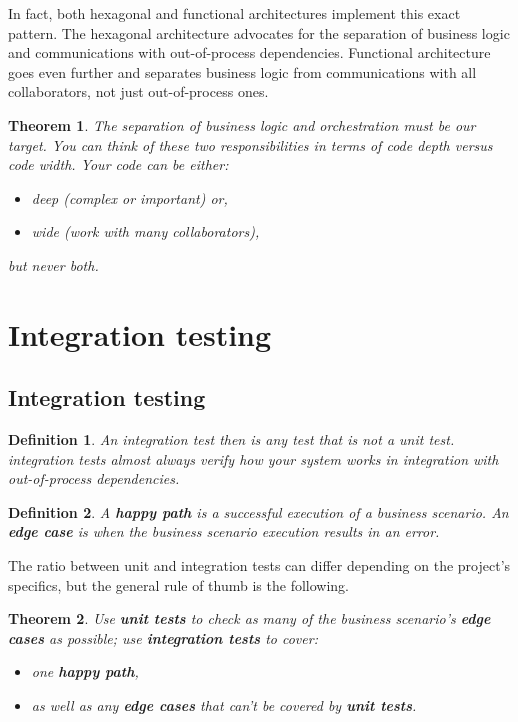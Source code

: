\documentclass{article}
\newtheorem{definition}{Definition}
\newtheorem{theorem}{Theorem}
\begin{document}
In fact, both hexagonal and functional architectures implement this exact pattern. The hexagonal architecture advocates for the separation of business logic and communications with out-of-process dependencies. Functional architecture goes even further and separates business logic from communications with all collaborators, not just out-of-process ones. 

\begin{theorem}
The separation of business logic and orchestration must be our target. You can think of these two responsibilities in terms of code depth versus code width. Your code can be either:
\begin{itemize}
	\item deep (complex or important) or,
	\item wide (work with many collaborators),
\end{itemize}
but never both.
\end{theorem}

\section{Integration testing}

\subsection{Integration testing}

\begin{definition}
An integration test then is any test that is not a unit test. integration tests almost always verify how your system works in integration with out-of-process dependencies.
\end{definition}


\begin{definition}
A \textbf{happy path} is a successful execution of a business scenario. An \textbf{edge case} is when the business scenario execution results in an error.
\end{definition}

The ratio between unit and integration tests can differ depending on the project’s specifics, but the general rule of thumb is the following.
\begin{theorem}
Use \textbf{unit tests} to check as many of the business scenario’s \textbf{edge cases} as possible; 
use  \textbf{integration tests} to cover:
\begin{itemize}
	\item  one \textbf{happy path}, 
	\item  as well as any \textbf{edge cases} that can’t be covered by \textbf{unit tests}.
\end{itemize}
\end{theorem}
\end{document}
